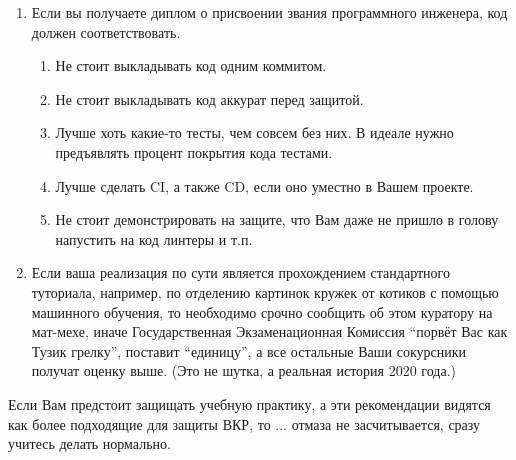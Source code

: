 \begin{enumerate}
\begin{itemize}
        \end{itemize}
  \item Если вы получаете диплом о присвоении звания программного инженера, код должен соответствовать.
        \begin{enumerate}
          \item Не стоит выкладывать код одним коммитом.
          \item Не стоит выкладывать код аккурат перед защитой.
          \item Лучше хоть какие-то тесты, чем совсем без них. В идеале нужно предъявлять процент покрытия кода тестами.
          \item Лучше  сделать \textsc{CI}, а также \textsc{CD}, если оно уместно в Вашем проекте.
          \item Не стоит демонстрировать на защите, что Вам даже не пришло в голову напустить на код линтеры и т.п.
        \end{enumerate}
  \item Если ваша реализация по сути является прохождением стандартного туториала,
  например, по отделению картинок кружек от котиков с помощью машинного обучения, то необходимо срочно сообщить об этом куратору на мат-мехе,
  иначе Государственная Экзаменацион\-ная Комиссия \enquote{порвёт Вас как Тузик грелку}, поставит \enquote{единицу},
  а все остальные Ваши сокурсники получат оценку выше. (Это не шутка, а реальная история 2020 года.)
\end{enumerate}

\noindent Если Вам предстоит защищать учебную практику, а эти рекомендации видятся как более подходящие для защиты ВКР, то ... отмаза не засчиты\-вается, сразу учитесь делать нормально.
